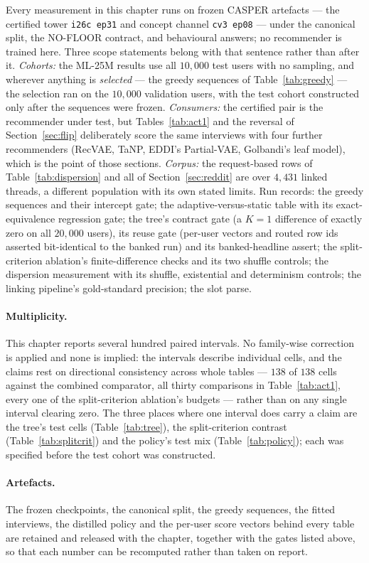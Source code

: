 \documentclass[11pt]{article}
\begin{document}
Every measurement in this chapter runs on frozen CASPER artefacts --- the certified tower \texttt{i26c
ep31} and concept channel \texttt{cv3 ep08} --- under the canonical split, the NO-FLOOR contract,
and behavioural answers; no recommender is trained here. Three scope statements belong with that sentence
rather than after it. \emph{Cohorts:} the ML-25M results use all $10{,}000$ test users with no
sampling, and wherever anything is \emph{selected} --- the greedy sequences of
Table~\ref{tab:greedy} --- the selection ran on the $10{,}000$ validation users, with the test
cohort constructed only after the sequences were frozen. \emph{Consumers:} the certified pair is
the recommender under test, but Tables~\ref{tab:act1} and the reversal of Section~\ref{sec:flip}
deliberately score the same interviews with four further recommenders (RecVAE, TaNP, EDDI's
Partial-VAE, Golbandi's leaf model), which is the point of those sections. \emph{Corpus:} the
request-based rows of Table~\ref{tab:dispersion} and all of Section~\ref{sec:reddit} are over
$4{,}431$ linked threads, a different population with its own stated limits. Run records: the
greedy sequences and their intercept gate; the adaptive-versus-static table with its
exact-equivalence regression gate; the tree's contract gate (a $K{=}1$ difference of exactly zero on
all $20{,}000$ users), its reuse gate (per-user vectors and routed row ids asserted bit-identical to
the banked run) and its banked-headline assert; the split-criterion ablation's finite-difference
checks and its two shuffle controls; the dispersion measurement with its shuffle, existential and
determinism controls; the linking pipeline's gold-standard precision; the slot parse.

\paragraph{Multiplicity.} This chapter reports several hundred paired intervals. No family-wise
correction is applied and none is implied: the intervals describe individual cells, and the claims
rest on directional consistency across whole tables --- $138$ of $138$ cells against the combined
comparator, all thirty comparisons in Table~\ref{tab:act1}, every one of the split-criterion
ablation's budgets --- rather than on any single interval clearing zero. The three places where one
interval does carry a claim are the tree's test cells (Table~\ref{tab:tree}), the split-criterion
contrast (Table~\ref{tab:splitcrit}) and the policy's test mix (Table~\ref{tab:policy}); each was
specified before the test cohort was constructed.

\paragraph{Artefacts.} The frozen checkpoints, the canonical split, the greedy sequences, the fitted
interviews, the distilled policy and the per-user score vectors behind every table are retained and
released with the chapter, together with the gates listed above, so that each number can be
recomputed rather than taken on report.



\end{document}
